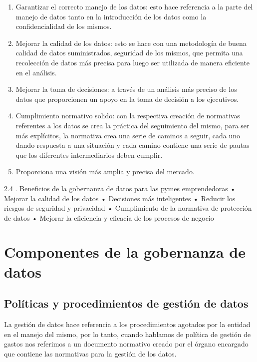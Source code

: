 \documentclass[
  letterpaper,
  DIV=11,
  numbers=noendperiod]{scrreprt}
\providecommand{\tightlist}{%
  \setlength{\itemsep}{0pt}\setlength{\parskip}{0pt}}\usepackage{longtable,booktabs,array}
\begin{document}
\begin{enumerate}
\def\labelenumi{\arabic{enumi}.}
\tightlist
\item
  Garantizar el correcto manejo de los datos: esto hace referencia a la
  parte del manejo de datos tanto en la introducción de los datos como
  la confidencialidad de los mismos.
\item
  Mejorar la calidad de los datos: esto se hace con una metodología de
  buena calidad de datos suministrados, seguridad de los mismos, que
  permita una recolección de datos más precisa para luego ser utilizada
  de manera eficiente en el análisis.
\item
  Mejorar la toma de decisiones: a través de un análisis más preciso de
  los datos que proporcionen un apoyo en la toma de decisión a los
  ejecutivos.
\item
  Cumplimiento normativo solido: con la respectiva creación de
  normativas referentes a los datos se crea la práctica del seguimiento
  del mismo, para ser más explícitos, la normativa crea una serie de
  caminos a seguir, cada uno dando respuesta a una situación y cada
  camino contiene una serie de pautas que los diferentes intermediarios
  deben cumplir.
\item
  Proporciona una visión más amplia y precisa del mercado.
\end{enumerate}

2.4 . Beneficios de la gobernanza de datos para las pymes emprendedoras
• Mejorar la calidad de los datos • Decisiones más inteligentes •
Reducir los riesgos de seguridad y privacidad • Cumplimiento de la
normativa de protección de datos • Mejorar la eficiencia y eficacia de
los procesos de negocio


\hypertarget{componentes-de-la-gobernanza-de-datos}{%
\chapter{Componentes de la gobernanza de
datos}\label{componentes-de-la-gobernanza-de-datos}}

\hypertarget{poluxedticas-y-procedimientos-de-gestiuxf3n-de-datos}{%
\section{Políticas y procedimientos de gestión de
datos}\label{poluxedticas-y-procedimientos-de-gestiuxf3n-de-datos}}

La gestión de datos hace referencia a los procedimientos agotados por la
entidad en el manejo del mismo, por lo tanto, cuando hablamos de
política de gestión de gastos nos referimos a un documento normativo
creado por el órgano encargado que contiene las normativas para la
gestión de los datos.
\end{document}
